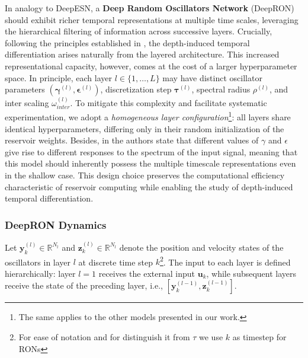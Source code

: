 In analogy to DeepESN, a \textbf{Deep Random Oscillators Network} (DeepRON) should exhibit richer temporal representations at multiple time scales, 
leveraging the hierarchical filtering of information across successive layers. 
Crucially, following the principles established in \cite{GALLICCHIO201787}, the depth-induced temporal differentiation arises naturally from the layered architecture.
This increased representational capacity, however, comes at the cost of a larger hyperparameter space.
In principle, each layer $l \in \{1, \dots, L\}$ may have distinct oscillator parameters $(\bm{\gamma}^{(l)}, \bm{\epsilon}^{(l)})$, discretization step $\bm{\tau}^{(l)}$, spectral radius $\rho^{(l)}$, and inter scaling $\omega_{inter}^{(l)}$.
To mitigate this complexity and facilitate systematic experimentation, we adopt a \emph{homogeneous layer configuration}\footnote{The same applies to the other models presented in our work.}: 
all layers share identical hyperparameters, differing only in their random initialization of the reservoir weights. Besides, in \cite{pmlr-v238-ceni24a} the authors state that different values of $\gamma$ and $\epsilon$ give rise to different responses to the spectrum of the input signal, meaning that this model should 
inherently possess the multiple timescale representations even in the shallow case. 
This design choice preserves the computational efficiency characteristic of reservoir computing while enabling the study of depth-induced temporal differentiation. 

\subsubsection{DeepRON Dynamics}
Let $\mathbf{y}^{(l)}_k \in \mathbb{R}^{N_l}$ and $\mathbf{z}^{(l)}_k \in \mathbb{R}^{N_l}$ denote the position and velocity states of the oscillators in layer $l$ at discrete time step $k$\footnote{For ease of notation and for distinguish it from $\tau$ we use $k$ as timestep for RONs}. 
The input to each layer is defined hierarchically: layer $l=1$ receives the external input $\mathbf{u}_k$, while subsequent layers receive the state of the preceding layer, i.e., $[\mathbf{y}^{(l-1)}_k, \mathbf{z}_k^{(l-1)}]$.


